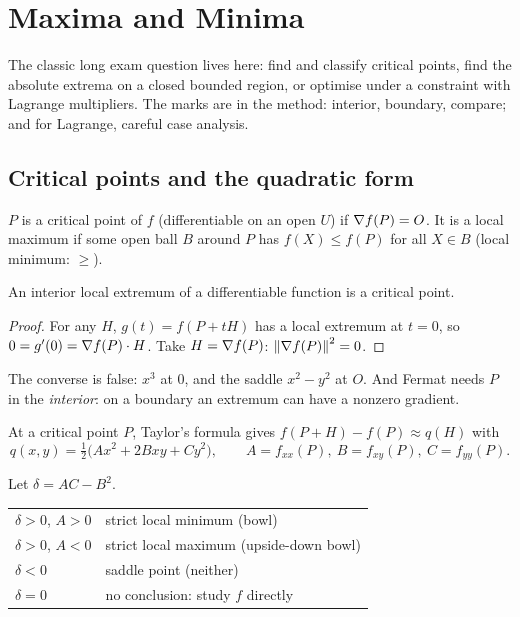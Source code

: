 \chapter{Maxima and Minima}\label{ch:four}

\begin{examnote}
The classic long exam question lives here: find and classify critical points, find the
absolute extrema on a closed bounded region, or optimise under a constraint with Lagrange
multipliers. The marks are in the method: interior, boundary, compare; and for Lagrange,
careful case analysis.
\end{examnote}

\section{Critical points and the quadratic form}

\begin{defi}
$P$ is a critical point of $f$ (differentiable on an open $U$) if $\nabla f(P)=O$. It is a local
maximum if some open ball $B$ around $P$ has $f(X)\le f(P)$ for all $X\in B$ (local minimum:
$\ge$).
\end{defi}

\begin{thm}[Fermat]
An interior local extremum of a differentiable function is a critical point.
\end{thm}

\begin{proof}
For any $H$, $g(t)=f(P+tH)$ has a local extremum at $t=0$, so $0=g'(0)=\nabla f(P)\cdot H$. Take
$H=\nabla f(P)$: $\left\lVert \nabla f(P)\right\rVert^2=0$.
\end{proof}

\begin{trap}
The converse is false: $x^3$ at $0$, and the saddle $x^2-y^2$ at $O$. And Fermat needs $P$ in
the \emph{interior}: on a boundary an extremum can have a nonzero gradient.
\end{trap}

\begin{defi}
At a critical point $P$, Taylor's formula gives $f(P+H)-f(P)\approx q(H)$ with
\[ q(x,y)=\tfrac12\big(Ax^2+2Bxy+Cy^2\big),\qquad A=f_{xx}(P),\ B=f_{xy}(P),\ C=f_{yy}(P). \]
\end{defi}

\begin{thm}
Let $\delta=AC-B^2$.
\begin{center}
\begin{tabular}{@{}ll@{}}
$\delta>0$, $A>0$ & strict local minimum (bowl)\\
$\delta>0$, $A<0$ & strict local maximum (upside-down bowl)\\
$\delta<0$ & saddle point (neither)\\
$\delta=0$ & no conclusion: study $f$ directly
\end{tabular}
\end{center}
\end{thm}

